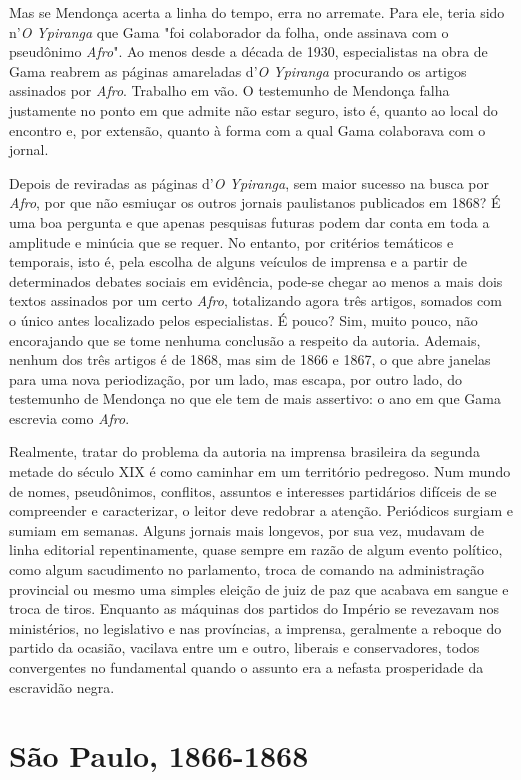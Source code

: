 Mas se Mendonça acerta a linha do tempo, erra no arremate. Para ele,
teria sido n'\emph{O Ypiranga} que Gama "foi colaborador da folha, onde
assinava com o pseudônimo \emph{Afro}". Ao menos desde a década de 1930,
especialistas na obra de Gama reabrem as páginas amareladas d'\emph{O
Ypiranga} procurando os artigos assinados por \emph{Afro}. Trabalho em
vão. O testemunho de Mendonça falha justamente no ponto em que admite
não estar seguro, isto é, quanto ao local do encontro e, por extensão,
quanto à forma com a qual Gama colaborava com o jornal.

Depois de reviradas as páginas d'\emph{O Ypiranga}, sem maior sucesso na
busca por \emph{Afro}, por que não esmiuçar os outros jornais
paulistanos publicados em 1868? É uma boa pergunta e que apenas
pesquisas futuras podem dar conta em toda a amplitude e minúcia que se
requer. No entanto, por critérios temáticos e temporais, isto é, pela
escolha de alguns veículos de imprensa e a partir de determinados
debates sociais em evidência, pode-se chegar ao menos a mais dois textos
assinados por um certo \emph{Afro}, totalizando agora três artigos,
somados com o único antes localizado pelos especialistas. É pouco? Sim,
muito pouco, não encorajando que se tome nenhuma conclusão a respeito da
autoria. Ademais, nenhum dos três artigos é de 1868, mas sim de 1866 e
1867, o que abre janelas para uma nova periodização, por um lado, mas
escapa, por outro lado, do testemunho de Mendonça no que ele tem de mais
assertivo: o ano em que Gama escrevia como \emph{Afro}.

Realmente, tratar do problema da autoria na imprensa brasileira da
segunda metade do século XIX é como caminhar em um território pedregoso.
Num mundo de nomes, pseudônimos, conflitos, assuntos e interesses
partidários difíceis de se compreender e caracterizar, o leitor deve
redobrar a atenção. Periódicos surgiam e sumiam em semanas. Alguns
jornais mais longevos, por sua vez, mudavam de linha editorial
repentinamente, quase sempre em razão de algum evento político, como
algum sacudimento no parlamento, troca de comando na administração
provincial ou mesmo uma simples eleição de juiz de paz que acabava em
sangue e troca de tiros. Enquanto as máquinas dos partidos do Império se
revezavam nos ministérios, no legislativo e nas províncias, a imprensa,
geralmente a reboque do partido da ocasião, vacilava entre um e outro,
liberais e conservadores, todos convergentes no fundamental quando o
assunto era a nefasta prosperidade da escravidão negra.

\section{São Paulo, 1866-1868}

